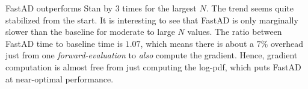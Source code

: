 FastAD outperforms Stan by 3 times for the largest $N$.
The trend seems quite stabilized from the start.
It is interesting to see that FastAD is only marginally slower than the  baseline
for moderate to large $N$ values.
The ratio between FastAD time to baseline time is $ 1.07$, which means there is about a $7\%$ overhead 
just from one \emph{forward-evaluation} to \emph{also} compute the gradient.
Hence, gradient computation is almost free from just computing the log-pdf,
which puts FastAD at near-optimal performance.
